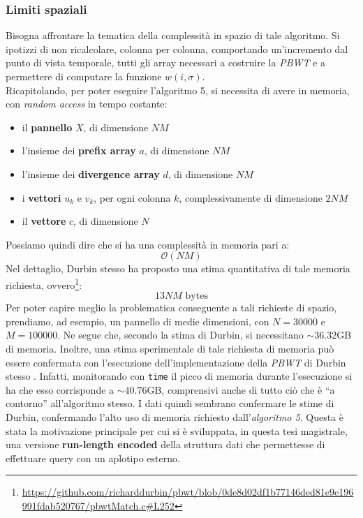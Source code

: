 \subsubsection{Limiti spaziali}
Bisogna affrontare la tematica della complessità in spazio di tale
algoritmo. Si ipotizzi di non ricalcolare, colonna per colonna, comportando
un'incremento dal punto di vista temporale, tutti gli array 
necessari a costruire la \textit{PBWT} e a permettere di computare la funzione
$w(i,\sigma)$.\\
Ricapitolando, per poter eseguire l'algoritmo 5, si necessita di avere in
memoria, con \textit{random access} in tempo costante:
\begin{itemize}
  \item il \textbf{pannello} $X$, di dimensione $NM$
  \item l'insieme dei \textbf{prefix array} $a$, di dimensione $NM$
  \item l'insieme dei \textbf{divergence array} $d$, di dimensione $NM$
  \item i \textbf{vettori} $u_k$ e $v_k$, per ogni colonna $k$, complessivamente
  di dimensione $2NM$ 
  \item il \textbf{vettore} $c$, di dimensione $N$
\end{itemize}
Possiamo quindi dire che si ha una complessità in memoria pari a:
\begin{equation}
  \label{eq:pbwtsize}
  \mathcal{O}(NM)
\end{equation}
Nel dettaglio, Durbin stesso ha proposto una stima quantitativa di tale memoria
richiesta,
ovvero\footnote{\scriptsize{\url{https://github.com/richarddurbin/pbwt/blob/0de8d02df1b77146ded81e9e196991fdab520767/pbwtMatch.c\#L252}}}:
\begin{equation}
  \label{eq:pbwtsize2}
  13NM\mbox{ bytes}
\end{equation}
Per poter capire meglio la problematica conseguente a tali richieste di spazio,
prendiamo, ad esempio, un pannello di 
medie dimensioni, con $N=30000$ e $M=100000$. Ne segue che, secondo la stima di
Durbin, si necessitano $\sim 36.32$GB di memoria. Inoltre, una stima
sperimentale di tale richiesta di memoria può essere confermata con l'esecuzione
dell'implementazione della \textit{PBWT} di Durbin stesso
\cite{durbin_gh}. Infatti, monitorando 
con \texttt{time} il picco di memoria durante l'esecuzione si ha che esso
corrisponde a $\sim 40.76$GB, comprensivi anche di tutto ciò che è ``a
contorno'' all'algoritmo stesso. I dati quindi sembrano confermare le stime di
Durbin, confermando l'alto uso di memoria richiesto dall'\textit{algoritmo
  5}. Questa è 
stata la motivazione principale per cui si è sviluppata, in questa tesi
magistrale, una versione \textbf{run-length encoded} della struttura dati che
permettesse di effettuare query con un aplotipo esterno.
